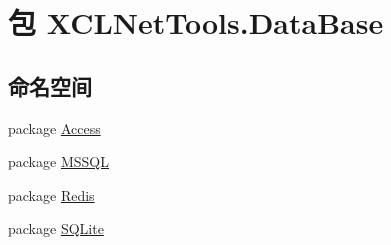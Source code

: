 \hypertarget{namespace_x_c_l_net_tools_1_1_data_base}{\section{包 X\-C\-L\-Net\-Tools.\-Data\-Base}
\label{namespace_x_c_l_net_tools_1_1_data_base}
}
\subsection*{命名空间}
\begin{DoxyCompactItemize}
\item 
package \hyperlink{namespace_x_c_l_net_tools_1_1_data_base_1_1_access}{Access}
\item 
package \hyperlink{namespace_x_c_l_net_tools_1_1_data_base_1_1_m_s_s_q_l}{M\-S\-S\-Q\-L}
\item 
package \hyperlink{namespace_x_c_l_net_tools_1_1_data_base_1_1_redis}{Redis}
\item 
package \hyperlink{namespace_x_c_l_net_tools_1_1_data_base_1_1_s_q_lite}{S\-Q\-Lite}
\end{DoxyCompactItemize}
